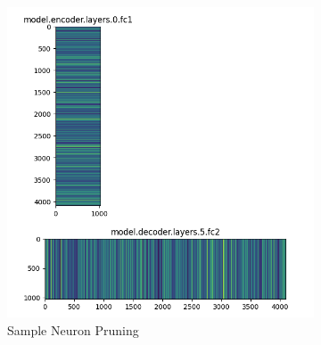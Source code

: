 \documentclass{article}
\begin{document}
    \begin{figure}[h!]
        \centering
        \begin{subfigure}[b]{0.55\textwidth}
            \centering
            \includegraphics[width=\textwidth]{pics/pa/pruning1}
            \caption{Sample Neuron Pruning}
            \label{fig:subfig1}
        \end{subfigure}
        \hspace{0.02\textwidth}
        \begin{subfigure}[b]{0.35\textwidth}
            \centering

\end{subfigure}
\end{figure}
\end{document}
